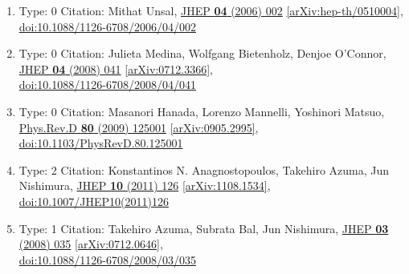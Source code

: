 \documentclass[a4paper,10pt]{article}
\begin{document}
\begin{enumerate}
\begin{enumerate}
  \item Type: 0 Citation: Mithat Unsal, \href{https://www.doi.org/10.1088/1126-6708/2006/04/002}{JHEP {\bf 04} (2006) 002}  \href{https://arxiv.org/abs/hep-th/0510004}{[arXiv:hep-th/0510004]},\\\href{https://www.doi.org/10.1088/1126-6708/2006/04/002}{doi:10.1088/1126-6708/2006/04/002}
  \item Type: 0 Citation: Julieta Medina, Wolfgang Bietenholz, Denjoe O'Connor, \href{https://www.doi.org/10.1088/1126-6708/2008/04/041}{JHEP {\bf 04} (2008) 041}  \href{https://arxiv.org/abs/0712.3366}{[arXiv:0712.3366]},\\\href{https://www.doi.org/10.1088/1126-6708/2008/04/041}{doi:10.1088/1126-6708/2008/04/041}
  \item Type: 0 Citation: Masanori Hanada, Lorenzo Mannelli, Yoshinori Matsuo, \href{https://www.doi.org/10.1103/PhysRevD.80.125001}{Phys.Rev.D {\bf 80} (2009) 125001}  \href{https://arxiv.org/abs/0905.2995}{[arXiv:0905.2995]},\\\href{https://www.doi.org/10.1103/PhysRevD.80.125001}{doi:10.1103/PhysRevD.80.125001}
  \item Type: 2 Citation: Konstantinos N. Anagnostopoulos, Takehiro Azuma, Jun Nishimura, \href{https://www.doi.org/10.1007/JHEP10(2011)126}{JHEP {\bf 10} (2011) 126}  \href{https://arxiv.org/abs/1108.1534}{[arXiv:1108.1534]},\\\href{https://www.doi.org/10.1007/JHEP10(2011)126}{doi:10.1007/JHEP10(2011)126}
  \item Type: 1 Citation: Takehiro Azuma, Subrata Bal, Jun Nishimura, \href{https://www.doi.org/10.1088/1126-6708/2008/03/035}{JHEP {\bf 03} (2008) 035}  \href{https://arxiv.org/abs/0712.0646}{[arXiv:0712.0646]},\\\href{https://www.doi.org/10.1088/1126-6708/2008/03/035}{doi:10.1088/1126-6708/2008/03/035}

\end{enumerate}
\end{enumerate}
\end{document}
